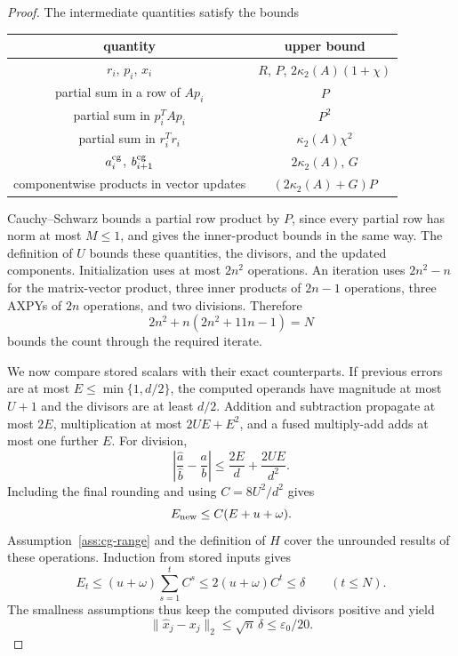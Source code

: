 \documentclass[11pt]{article}
\theoremstyle{definition}
\begin{document}
\begin{proof}
The intermediate quantities satisfy the bounds
\begin{center}
\begin{tabular}{c|c}
quantity & upper bound \\ \hline
$r_i$, $p_i$, $x_i$ & $R$, $P$, $2\kappa_2(A)(1+\chi)$ \\
partial sum in a row of $Ap_i$ & $P$ \\
partial sum in $p_i^TAp_i$ & $P^2$ \\
partial sum in $r_i^Tr_i$ & $\kappa_2(A)\chi^2$ \\
$a_i^{\rm cg}$, $b_{i+1}^{\rm cg}$ & $2\kappa_2(A)$, $G$ \\
componentwise products in vector updates & $(2\kappa_2(A)+G)P$
\end{tabular}
\end{center}
Cauchy--Schwarz bounds a partial row product by $P$, since every
partial row has norm at most $M\le1$, and gives the inner-product
bounds in the same way.  The definition of $U$ bounds these
quantities, the divisors, and the updated components.
Initialization uses at most $2n^2$ operations.  An iteration uses
$2n^2-n$ for the matrix-vector product, three inner products of
$2n-1$ operations, three AXPYs of $2n$ operations, and two divisions.
Therefore
\begin{equation}
 2n^2+n(2n^2+11n-1)=N
 \label{eq:operation-count}
\end{equation}
bounds the count through the required iterate.

We now compare stored scalars with their exact counterparts.
If previous errors are at most $E\le\min\{1,d/2\}$, the computed
operands have magnitude at most $U+1$ and the divisors are at least
$d/2$.  Addition and subtraction propagate at most $2E$,
multiplication at most $2UE+E^2$, and a fused multiply-add adds at
most one further $E$.  For division,
\[
 \left|\frac{\widehat a}{\widehat b}-\frac ab\right|
 \le\frac{2E}{d}+\frac{2UE}{d^2}.
\]
Including the final rounding and using $C=8U^2/d^2$ gives
\begin{equation}
 E_{\rm new}\le C(E+u+\omega).
 \label{eq:circuit-step}
\end{equation}
Assumption~\ref{ass:cg-range} and the definition of $H$ cover the
unrounded results of these operations.  Induction from stored inputs gives
\begin{equation}
 E_t\le(u+\omega)\sum_{s=1}^tC^s
 \le2(u+\omega)C^t\le\delta\qquad(t\le N).
 \label{eq:circuit-induction}
\end{equation}
The smallness assumptions thus keep the computed divisors positive
and yield
\begin{equation}
 \|\widehat x_j-x_j\|_2\le\sqrt n\,\delta\le\varepsilon_0/20.
 \label{eq:x-perturbation}
\end{equation}


\end{proof}
\end{document}
